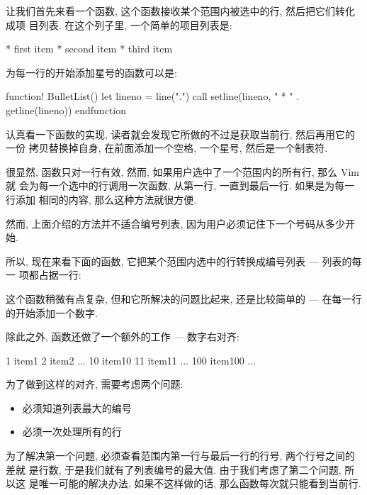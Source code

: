 让我们首先来看一个函数, 这个函数接收某个范围内被选中的行, 然后把它们转化成项
目列表. 在这个列子里, 一个简单的项目列表是:
\begin{vimcode}
* first item
* second item
* third item
\end{vimcode}
为每一行的开始添加星号的函数可以是:
\begin{vimcode}
function! BulletList()
    let lineno = line(".")
    call setline(lineno, "    * " . getline(lineno))
endfunction
\end{vimcode}

认真看一下函数的实现, 读者就会发现它所做的不过是获取当前行, 然后再用它的一份
拷贝替换掉自身, 在前面添加一个空格, 一个星号, 然后是一个制表符.

很显然, 函数只对一行有效, 然而, 如果用户选中了一个范围内的所有行, 那么 Vim 就
会为每一个选中的行调用一次函数, 从第一行, 一直到最后一行. 如果是为每一行添加
相同的内容, 那么这种方法就很方便.

然而, 上面介绍的方法并不适合编号列表, 因为用户必须记住下一个号码从多少开始.

所以, 现在来看下面的函数, 它把某个范围内选中的行转换成编号列表 --- 列表的每一
项都占据一行:

这个函数稍微有点复杂, 但和它所解决的问题比起来, 还是比较简单的 --- 在每一行
的开始添加一个数字.

除此之外, 函数还做了一个额外的工作 --- 数字右对齐:
\begin{vimcode}
    1 item1
    2 item2
    ...
   10 item10
   11 item11
    ...
  100 item100
    ...
\end{vimcode}

为了做到这样的对齐, 需要考虑两个问题:
\begin{itemize}
    \item 必须知道列表最大的编号
    \item 必须一次处理所有的行
\end{itemize}

为了解决第一个问题, 必须查看范围内第一行与最后一行的行号, 两个行号之间的差就
是行数, 于是我们就有了列表编号的最大值. 由于我们考虑了第二个问题, 所以这
是唯一可能的解决办法, 如果不这样做的话, 那么函数每次就只能看到当前行.

